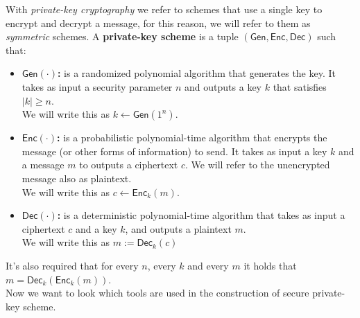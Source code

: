 With \emph{private-key cryptography} we refer to schemes that use a single key to encrypt and decrypt a message, for this reason, we will refer to them as \emph{symmetric} schemes.
A \textbf{private-key scheme} is a tuple $(\mathsf{Gen}, \mathsf{Enc}, \mathsf{Dec})$ such that:
\begin{itemize}
    \item{\textbf{$\mathsf{Gen}(\cdot)$:} is a randomized polynomial algorithm that generates the key. It takes as input a security parameter $n$ and outputs a key $k$ that satisfies $|k| \geq n$.\\
        We will write this as $k \leftarrow \mathsf{Gen}(1^n)$.}
    \item{\textbf{$\mathsf{Enc}(\cdot)$:} is a probabilistic polynomial-time algorithm that encrypts the message (or other forms of information) to send. It takes as input a key $k$ and a message $m$ to outputs a ciphertext $c$. We will refer to the unencrypted message also as plaintext.\\
        We will write this as $c \leftarrow \mathsf{Enc}_k(m)$.}
    \item{\textbf{$\mathsf{Dec}(\cdot)$:} is a deterministic polynomial-time algorithm that takes as input a ciphertext $c$ and a key $k$, and outputs a plaintext $m$.\\
        We will write this as $m := \mathsf{Dec}_k(c)$}
\end{itemize}
It's also required that for every $n$, every $k$ and every $m$ it holds that $m = \mathsf{Dec}_k(\mathsf{Enc}_k(m))$.\\
Now we want to look which tools are used in the construction of secure private-key scheme.
